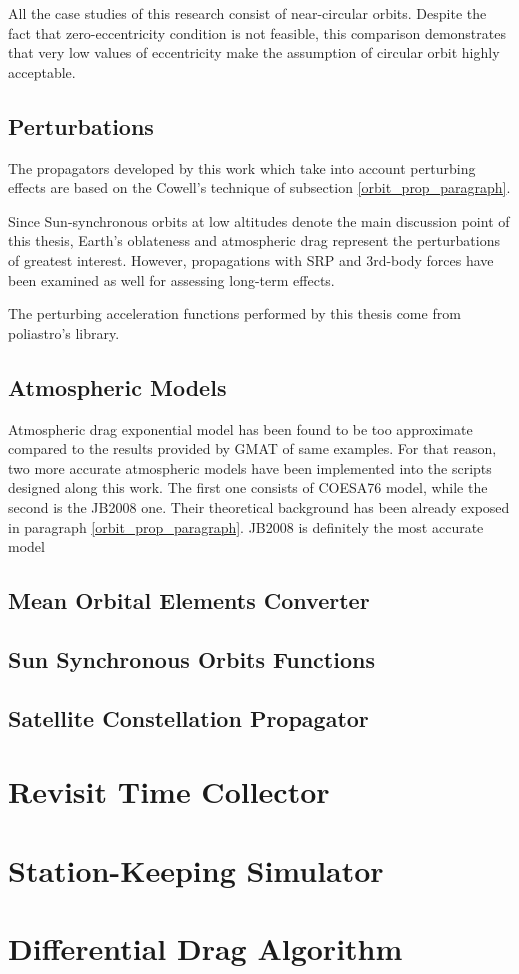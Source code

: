 All the case studies of this research consist of near-circular orbits.
Despite the fact that zero-eccentricity condition is not feasible, this comparison demonstrates that very low values of eccentricity make the assumption of circular orbit highly acceptable.  


\subsection{Perturbations}
The propagators developed by this work which take into account perturbing effects are based on the Cowell's technique of subsection \ref{orbit_prop_paragraph}.

Since Sun-synchronous orbits at low altitudes denote the main discussion point of this thesis, Earth's oblateness and atmospheric drag represent the perturbations of greatest interest. 
However, propagations with SRP and 3rd-body forces have been examined as well for assessing long-term effects. 

The perturbing acceleration functions performed by this thesis come from poliastro's library.

\subsection{Atmospheric Models}
Atmospheric drag exponential model has been found to be too approximate compared to the results provided by GMAT of same examples.
For that reason, two more accurate atmospheric models have been implemented into the scripts designed along this work.
The first one consists of COESA76 model, while the second is the JB2008 one.
Their theoretical background has been already exposed in paragraph \ref{orbit_prop_paragraph}.
JB2008 is definitely the most accurate model


\subsection{Mean Orbital Elements Converter}
\subsection{Sun Synchronous Orbits Functions}
\subsection{Satellite Constellation Propagator}

\section{Revisit Time Collector}

\section{Station-Keeping Simulator}

\section{Differential Drag Algorithm}